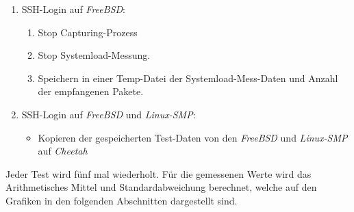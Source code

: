 {\begin{enumerate}
\begin{enumerate}
		\end{enumerate}
	\item SSH-Login auf \emph{FreeBSD}:
		\begin{enumerate}
			\item Stop Capturing-Prozess
			\item Stop Systemload-Messung.
			\item Speichern in einer Temp-Datei der Systemload-Mess-Daten und
				Anzahl der empfangenen Pakete. 
		\end{enumerate}
	\item SSH-Login auf \emph{FreeBSD} und \emph{Linux-SMP}:
		\begin{itemize}
			\item Kopieren der gespeicherten Test-Daten von den \emph{FreeBSD} und
			\emph{Linux-SMP} auf \emph{Cheetah}
		\end{itemize}
\end{enumerate}
Jeder Test wird fünf mal wiederholt. Für die gemessenen Werte wird das
Arithmetisches Mittel und Standardabweichung berechnet, welche auf den Grafiken
in den folgenden Abschnitten dargestellt sind.

}
